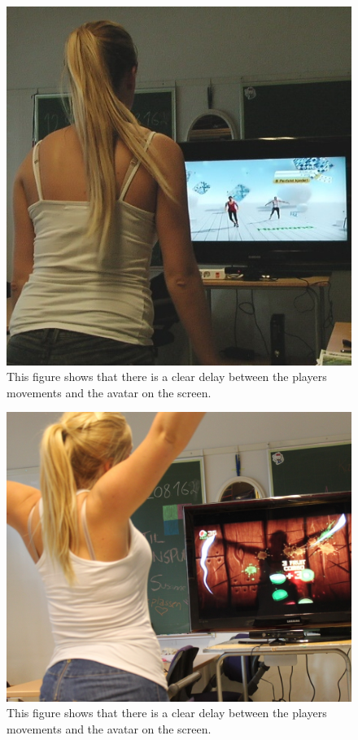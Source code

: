 \begin{figure} [H]
\centering
\includegraphics[scale=0.5]{kineDelay.jpg}
\caption[Kinect sensor delay]{This figure shows that there is a clear delay between the players movements and the avatar on the screen.}
\label{fig:remakeDelay}
\end{figure} 

\begin{figure} [H]
\centering
\includegraphics[scale=0.1]{FruitNinjaDelay.jpg}
\caption[Kinect sensor delay]{This figure shows that there is a clear delay between the players movements and the avatar on the screen.}
\label{fig:remakeDelay}
\end{figure} 


